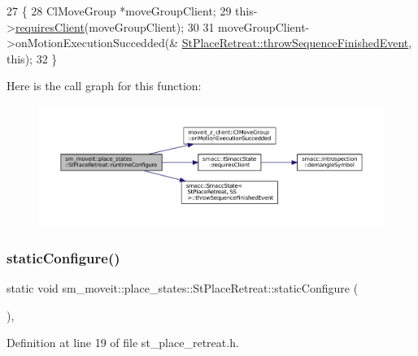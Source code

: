 \begin{DoxyCode}
27     \{
28         ClMoveGroup *moveGroupClient;
29         this->\hyperlink{classsmacc_1_1ISmaccState_a7f95c9f0a6ea2d6f18d1aec0519de4ac}{requiresClient}(moveGroupClient);
30 
31         moveGroupClient->onMotionExecutionSuccedded(&
      \hyperlink{classsmacc_1_1SmaccState_a49dcfc25824f7e083dd4b999c49ab2b6}{StPlaceRetreat::throwSequenceFinishedEvent}, \textcolor{keyword}{this});
32     \}
\end{DoxyCode}
Here is the call graph for this function\+:
\nopagebreak
\begin{figure}[H]
\begin{center}
\leavevmode
\includegraphics[width=350pt]{structsm__moveit_1_1place__states_1_1StPlaceRetreat_ab821f5ef9e9ffb35ba9f63917dac2854_cgraph}
\end{center}
\end{figure}
\mbox{\label{structsm__moveit_1_1place__states_1_1StPlaceRetreat_a6f2a55cf2350568bf054c20eb9a59c94}} 
\subsubsection{\texorpdfstring{static\+Configure()}{staticConfigure()}}
{\footnotesize\ttfamily static void sm\+\_\+moveit\+::place\+\_\+states\+::\+St\+Place\+Retreat\+::static\+Configure (\begin{DoxyParamCaption}{ }\end{DoxyParamCaption})\hspace{0.3cm}{\ttfamily [inline]}, {\ttfamily [static]}}



Definition at line 19 of file st\+\_\+place\+\_\+retreat.\+h.


